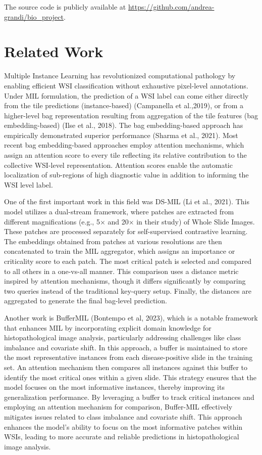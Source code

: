 \documentclass[10pt,twocolumn]{article}
\begin{document}
The source code is publicly available at \url{https://github.com/andrea-grandi/bio_project}.

\section{Related Work} \label{related}
Multiple Instance Learning has revolutionized computational pathology by enabling efficient WSI classification without exhaustive pixel-level annotations. Under MIL formulation, the prediction of a WSI label can come either directly from the tile predictions (instance-based) (Campanella et al.,2019)\cite{campanella2019clinical}, or from a higher-level bag representation resulting from aggregation of the tile features (bag embedding-based) (Ilse et al., 2018)\cite{ilse2018attention}. The bag embedding-based approach has empirically demonstrated superior performance (Sharma et al., 2021)\cite{conf/midl/SharmaSEMSB21}. Most recent bag embedding-based approaches employ attention mechanisms, which assign an attention score to every tile reflecting its relative contribution to the collective WSI-level representation. Attention scores enable the automatic localization of sub-regions of high diagnostic value in addition to informing the WSI level label.

One of the first important work in this field was DS-MIL (Li et al., 2021)\cite{li2021dualstreammultipleinstancelearning}. This model utilizes a dual-stream framework, where patches are extracted from different magnifications (e.g., 5× and 20× in their study) of Whole Slide Images. These patches are processed separately for self-supervised contrastive learning. The embeddings obtained from patches at various resolutions are then concatenated to train the MIL aggregator, which assigns an importance or criticality score to each patch. The most critical patch is selected and compared to all others in a one-vs-all manner. This comparison uses a distance metric inspired by attention mechanisms, though it differs significantly by comparing two queries instead of the traditional key-query setup. Finally, the distances are aggregated to generate the final bag-level prediction.

Another work is BufferMIL (Bontempo et al, 2023)\cite{10.1007/978-3-031-43153-1_1}, which is a notable framework that enhances MIL by incorporating explicit domain knowledge for histopathological image analysis, particularly addressing challenges like class imbalance and covariate shift. In this approach, a buffer is maintained to store the most representative instances from each disease-positive slide in the training set. An attention mechanism then compares all instances against this buffer to identify the most critical ones within a given slide. This strategy ensures that the model focuses on the most informative instances, thereby improving its generalization performance. By leveraging a buffer to track critical instances and employing an attention mechanism for comparison, Buffer-MIL effectively mitigates issues related to class imbalance and covariate shift. This approach enhances the model's ability to focus on the most informative patches within WSIs, leading to more accurate and reliable predictions in histopathological image analysis.
\end{document}
